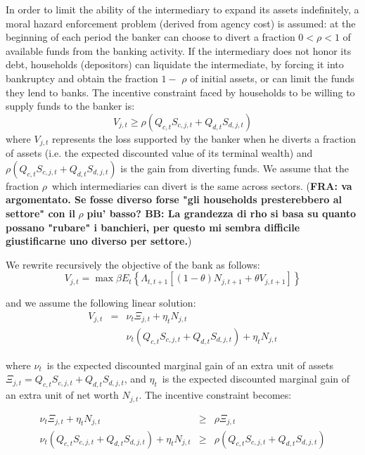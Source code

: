 \documentclass{article}
\begin{document}
In order to limit the ability of the intermediary to expand its assets
indefinitely, a moral hazard enforcement problem (derived from agency cost)
is assumed: at the beginning of each period the banker can choose to divert
a fraction $0<\rho <1$ of available funds from the banking activity. If the
intermediary does not honor its debt, households (depositors) can liquidate
the intermediate, by forcing it into bankruptcy and obtain the fraction $1-$ 
$\rho $ of initial assets, or can limit the funds they lend to banks. The
incentive constraint faced by households to be willing to supply funds to
the banker is:%
\begin{equation*}
V_{j,t}\geq \rho (Q_{c,t}S_{c,j,t}+Q_{d,t}S_{d,j,t})
\end{equation*}%
where $V_{j,t}$ represents the loss supported by the banker when he diverts
a fraction of assets (i.e. the expected discounted value of its terminal
wealth) and $\rho (Q_{c,t}S_{c,j,t}+Q_{d,t}S_{d,j,t})$ is the gain from
diverting funds. We assume that the fraction $\rho $\ which intermediaries
can divert is the same across sectors. (\textbf{FRA: va argomentato. Se
fosse diverso forse "gli households presterebbero al settore" con il }$\rho $
\textbf{piu' basso? BB: La grandezza di rho si basa su quanto possano
"rubare" i banchieri, per questo mi sembra difficile giustificarne uno
diverso per settore.})

We rewrite recursively the objective of the bank as follows:%
\begin{equation}
V_{j,t}=\max \beta E_{t}\left\{ \Lambda _{t,t+1}\left[ \left( 1-\theta
\right) N_{j,t+1}+\theta V_{j,t+1}\right] \right\}  \label{bank_objective}
\end{equation}

and we assume the following linear solution:%
\begin{eqnarray*}
V_{j,t} &=&\nu _{t}\Xi _{j,t}+\eta _{t}N_{j,t} \\
&&\nu _{t}\left( Q_{c,t}S_{c,j,t}+Q_{d,t}S_{d,j,t}\right) +\eta _{t}N_{j,t}
\end{eqnarray*}

\textbf{\bigskip }

where $\nu _{t}$\ is the expected discounted marginal gain of an extra unit
of assets $\Xi _{j,t}=Q_{c,t}S_{c,j,t}+Q_{d,t}S_{d,j,t}$, and $\eta _{t}$\
is the expected discounted marginal gain of an extra unit of net worth $%
N_{j,t}$. The incentive constraint becomes:

\begin{eqnarray*}
\nu _{t}\Xi _{j,t}+\eta _{t}N_{j,t} &\geq &\rho \Xi _{j,t} \\
\nu _{t}(Q_{c,t}S_{c,j,t}+Q_{d,t}S_{d,j,t})+\eta _{t}N_{j,t} &\geq &\rho
(Q_{c,t}S_{c,j,t}+Q_{d,t}S_{d,j,t})
\end{eqnarray*}
\end{document}
